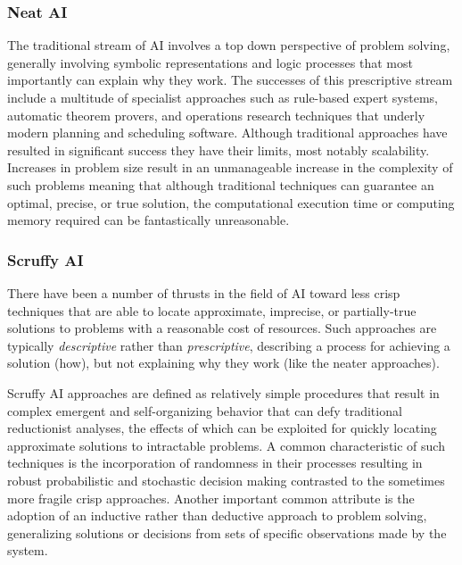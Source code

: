 \subsubsection{Neat AI}
The traditional stream of AI involves a top down perspective of problem solving, generally involving symbolic representations and logic processes that most importantly can explain why they work. The successes of this prescriptive stream include a multitude of specialist approaches such as rule-based expert systems, automatic theorem provers, and operations research techniques that underly modern planning and scheduling software. Although traditional approaches have resulted in significant success they have their limits, most notably scalability. Increases in problem size result in an unmanageable increase in the complexity of such problems meaning that although traditional techniques can guarantee an optimal, precise, or true solution, the computational execution time or computing memory required can be fantastically unreasonable.

\subsubsection{Scruffy AI}
There have been a number of thrusts in the field of AI toward less crisp techniques that are able to locate approximate, imprecise, or partially-true solutions to problems with a reasonable cost of resources. Such approaches are typically \emph{descriptive} rather than \emph{prescriptive}, describing a process for achieving a solution (how), but not explaining why they work (like the neater approaches). 

Scruffy AI approaches are defined as relatively simple procedures that result in complex emergent and self-organizing behavior that can defy traditional reductionist analyses, the effects of which can be exploited for quickly locating approximate solutions to intractable problems. A common characteristic of such techniques is the incorporation of randomness in their processes resulting in robust probabilistic and stochastic decision making contrasted to the sometimes more fragile crisp approaches. Another important common attribute is the adoption of an inductive rather than deductive approach to problem solving, generalizing solutions or decisions from sets of specific observations made by the system.

% 
% 
